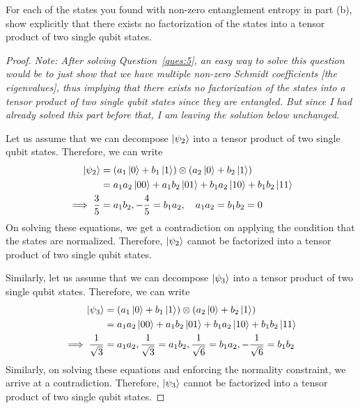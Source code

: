 \begin{solution}[label=ques:4c]
  \begin{question}
    For each of the states you found with non-zero entanglement entropy in part (b), show explicitly that there exists no factorization of the states into a tensor product of two single qubit states.
  \end{question}
  \tcblower{}
  \begin{proof}
    \textit{Note: After solving Question~\ref{ques:5}, an easy way to solve this question would be to just show that we have multiple non-zero Schmidt coefficients [the eigenvalues], thus implying that there exists no factorization of the states into a tensor product of two single qubit states since they are entangled. But since I had already solved this part before that, I am leaving the solution below unchanged.}\par\bigskip
    Let us assume that we can decompose $\ket{\psi_2}$ into a tensor product of two single qubit states. Therefore, we can write
    \begin{equation}
      \begin{split}
        \ket{\psi_2} &= \left(a_1\ket{0} + b_1\ket{1}\right)\otimes\left(a_2\ket{0} + b_2\ket{1}\right)\\
        &= a_1a_2\ket{00} + a_1b_2\ket{01} + b_1a_2\ket{10} + b_1b_2\ket{11}\\
        \implies \frac{3}{5} &= a_1b_2, -\frac{4}{5} = b_1a_2,\quad a_1a_2 = b_1b_2 = 0
      \end{split}
      \label{eq:psi2decomp}
    \end{equation}
    On solving these equations, we get a contradiction on applying the condition that the states are normalized. Therefore, $\ket{\psi_2}$ cannot be factorized into a tensor product of two single qubit states.\par\bigskip

    Similarly, let us assume that we can decompose $\ket{\psi_3}$ into a tensor product of two single qubit states. Therefore, we can write
    \begin{equation}
      \begin{split}
      \ket{\psi_3} &= \left(a_1\ket{0} + b_1\ket{1}\right)\otimes\left(a_2\ket{0} + b_2\ket{1}\right)\\
      &= a_1a_2\ket{00} + a_1b_2\ket{01} + b_1a_2\ket{10} + b_1b_2\ket{11}\\
      \implies \frac{1}{\sqrt{3}} &= a_1a_2, \frac{1}{\sqrt{3}} = a_1b_2, \frac{1}{\sqrt{6}} = b_1a_2, -\frac{1}{\sqrt{6}} = b_1b_2
      \end{split}
      \label{eq:psi3decomp}
    \end{equation}
    Similarly, on solving these equations and enforcing the normality constraint, we arrive at a contradiction. Therefore, $\ket{\psi_3}$ cannot be factorized into a tensor product of two single qubit states.
  \end{proof}
\end{solution}
